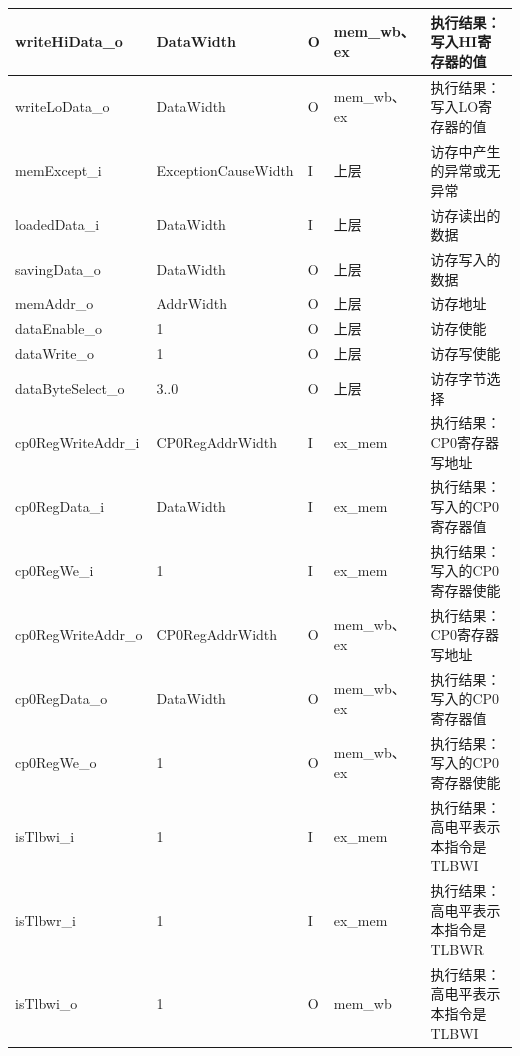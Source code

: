 \documentclass{article}
\begin{document}
\begin{spacing}{1.4}
\begin{longtable}{l|l|l|l|p{5cm}}
\hline writeHiData\_o          & DataWidth              & O     & mem\_wb、ex   & 执行结果：写入HI寄存器的值 \\
\hline writeLoData\_o          & DataWidth              & O     & mem\_wb、ex   & 执行结果：写入LO寄存器的值 \\
\hline memExcept\_i            & ExceptionCauseWidth    & I     & 上层          & 访存中产生的异常或无异常 \\
\hline loadedData\_i           & DataWidth              & I     & 上层          & 访存读出的数据 \\
\hline savingData\_o           & DataWidth              & O     & 上层          & 访存写入的数据 \\
\hline memAddr\_o              & AddrWidth              & O     & 上层          & 访存地址 \\
\hline dataEnable\_o           & 1                      & O     & 上层          & 访存使能 \\
\hline dataWrite\_o            & 1                      & O     & 上层          & 访存写使能 \\
\hline dataByteSelect\_o       & 3..0                   & O     & 上层          & 访存字节选择 \\
\hline cp0RegWriteAddr\_i      & CP0RegAddrWidth        & I     & ex\_mem       & 执行结果：CP0寄存器写地址 \\
\hline cp0RegData\_i           & DataWidth              & I     & ex\_mem       & 执行结果：写入的CP0寄存器值 \\
\hline cp0RegWe\_i             & 1                      & I     & ex\_mem       & 执行结果：写入的CP0寄存器使能 \\
\hline cp0RegWriteAddr\_o      & CP0RegAddrWidth        & O     & mem\_wb、ex   & 执行结果：CP0寄存器写地址 \\
\hline cp0RegData\_o           & DataWidth              & O     & mem\_wb、ex   & 执行结果：写入的CP0寄存器值 \\
\hline cp0RegWe\_o             & 1                      & O     & mem\_wb、ex   & 执行结果：写入的CP0寄存器使能 \\
\hline isTlbwi\_i              & 1                      & I     & ex\_mem       & 执行结果：高电平表示本指令是TLBWI \\
\hline isTlbwr\_i              & 1                      & I     & ex\_mem       & 执行结果：高电平表示本指令是TLBWR \\
\hline isTlbwi\_o              & 1                      & O     & mem\_wb       & 执行结果：高电平表示本指令是TLBWI \\

\end{longtable}
\end{spacing}
\end{document}
